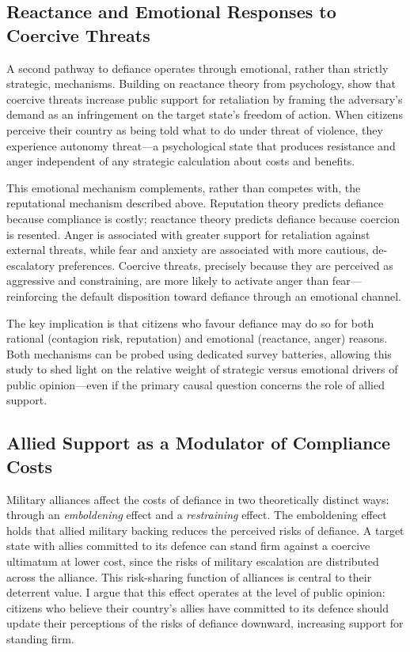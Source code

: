 \subsection{Reactance and Emotional Responses to Coercive Threats}

A second pathway to defiance operates through emotional, rather than strictly strategic, mechanisms. Building on reactance theory from psychology, \textcite{powers_psychology_2023} show that coercive threats increase public support for retaliation by framing the adversary's demand as an infringement on the target state's freedom of action. When citizens perceive their country as being told what to do under threat of violence, they experience autonomy threat---a psychological state that produces resistance and anger independent of any strategic calculation about costs and benefits.

This emotional mechanism complements, rather than competes with, the reputational mechanism described above. Reputation theory predicts defiance because compliance is costly;\autocite{dafoe_coercion_2021} reactance theory predicts defiance because coercion is resented.\autocite{powers_psychology_2023} Anger is associated with greater support for retaliation against external threats,\autocite{shandler_cyber_2021, fisk_emotions_2019} while fear and anxiety are associated with more cautious, de-escalatory preferences.\autocite{huddy_threat_2005} Coercive threats, precisely because they are perceived as aggressive and constraining, are more likely to activate anger than fear---reinforcing the default disposition toward defiance through an emotional channel.

The key implication is that citizens who favour defiance may do so for both rational (contagion risk, reputation) and emotional (reactance, anger) reasons. Both mechanisms can be probed using dedicated survey batteries, allowing this study to shed light on the relative weight of strategic versus emotional drivers of public opinion---even if the primary causal question concerns the role of allied support.

\subsection{Allied Support as a Modulator of Compliance Costs}

Military alliances affect the costs of defiance in two theoretically distinct ways: through an \textit{emboldening} effect and a \textit{restraining} effect.\autocite{fang_concede_2014} The emboldening effect holds that allied military backing reduces the perceived risks of defiance. A target state with allies committed to its defence can stand firm against a coercive ultimatum at lower cost, since the risks of military escalation are distributed across the alliance. This risk-sharing function of alliances is central to their deterrent value.\autocite{leeds_alliances_2003, benson_inducing_2014} I argue that this effect operates at the level of public opinion: citizens who believe their country's allies have committed to its defence should update their perceptions of the risks of defiance downward, increasing support for standing firm.


